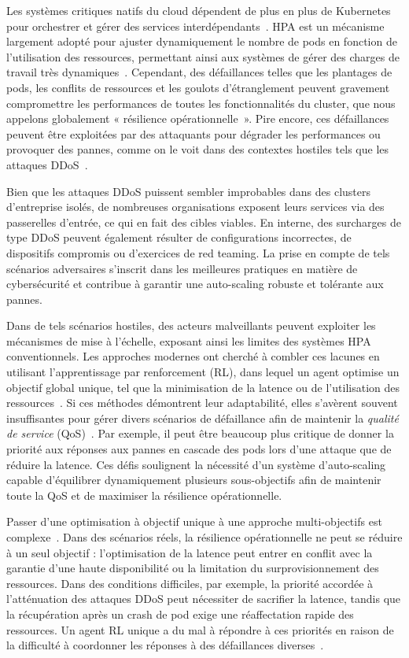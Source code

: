 Les systèmes critiques natifs du cloud dépendent de plus en plus de Kubernetes pour orchestrer et gérer des services interdépendants~\cite{Pahl2019}. HPA est un mécanisme largement adopté pour ajuster dynamiquement le nombre de pods en fonction de l'utilisation des ressources, permettant ainsi aux systèmes de gérer des charges de travail très dynamiques~\cite{Toka2020}. Cependant, des défaillances telles que les plantages de pods, les conflits de ressources et les goulots d'étranglement peuvent gravement compromettre les performances de toutes les fonctionnalités du cluster, que nous appelons globalement « résilience opérationnelle~\cite{burns2016borg}». Pire encore, ces défaillances peuvent être exploitées par des attaquants pour dégrader les performances ou provoquer des pannes, comme on le voit dans des contextes hostiles tels que les attaques DDoS~\cite{David2021}.

Bien que les attaques DDoS puissent sembler improbables dans des clusters d'entreprise isolés, de nombreuses organisations exposent leurs services via des passerelles d'entrée, ce qui en fait des cibles viables. En interne, des surcharges de type DDoS peuvent également résulter de configurations incorrectes, de dispositifs compromis ou d'exercices de red teaming. La prise en compte de tels scénarios adversaires s'inscrit dans les meilleures pratiques en matière de cybersécurité et contribue à garantir une auto-scaling robuste et tolérante aux pannes.

Dans de tels scénarios hostiles, des acteurs malveillants peuvent exploiter les mécanismes de mise à l'échelle, exposant ainsi les limites des systèmes HPA conventionnels. Les approches modernes ont cherché à combler ces lacunes en utilisant l'apprentissage par renforcement (RL), dans lequel un agent optimise un objectif global unique, tel que la minimisation de la latence ou de l'utilisation des ressources~\cite{Gari2021}. Si ces méthodes démontrent leur adaptabilité, elles s'avèrent souvent insuffisantes pour gérer divers scénarios de défaillance afin de maintenir la \textit{qualité de service} (QoS)~\cite{Liu2024}. Par exemple, il peut être beaucoup plus critique de donner la priorité aux réponses aux pannes en cascade des pods lors d'une attaque que de réduire la latence. Ces défis soulignent la nécessité d'un système d'auto-scaling capable d'équilibrer dynamiquement plusieurs sous-objectifs afin de maintenir toute la QoS et de maximiser la résilience opérationnelle.

Passer d'une optimisation à objectif unique à une approche multi-objectifs est complexe~\cite{Shoham2009MAS}. Dans des scénarios réels, la résilience opérationnelle ne peut se réduire à un seul objectif : l'optimisation de la latence peut entrer en conflit avec la garantie d'une haute disponibilité ou la limitation du surprovisionnement des ressources. Dans des conditions difficiles, par exemple, la priorité accordée à l'atténuation des attaques DDoS peut nécessiter de sacrifier la latence, tandis que la récupération après un crash de pod exige une réaffectation rapide des ressources. Un agent RL unique a du mal à répondre à ces priorités en raison de la difficulté à coordonner les réponses à des défaillances diverses~\cite{Jennings1998}.

